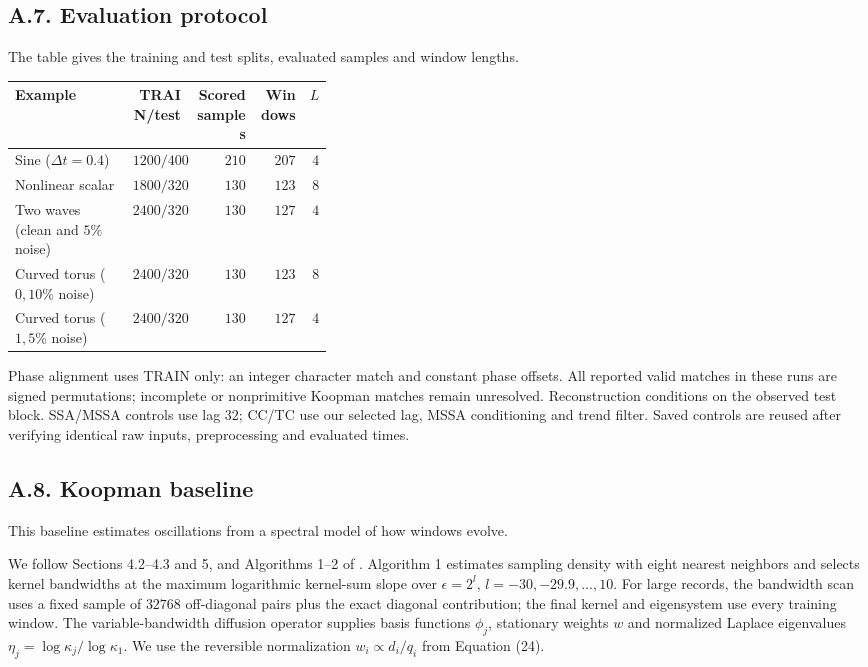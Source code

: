 \documentclass[11pt,a4paper]{article}
\begin{document}
\subsection*{A.7. Evaluation protocol}
\label{app:evaluation}
The table gives the training and test splits, evaluated samples and window lengths.
\begin{center}
\begin{tabular}{@{}p{0.37\linewidth}rrrr@{}}
\toprule
Example & TRAIN/test & Scored samples & Windows & $L$\\
\midrule
Sine ($\Delta t=0.4$) & $1200/400$ & $210$ & $207$ & $4$\\
Nonlinear scalar & $1800/320$ & $130$ & $123$ & $8$\\
Two waves (clean and $5\%$ noise) & $2400/320$ & $130$ & $127$ & $4$\\
Curved torus ($0,10\%$ noise) & $2400/320$ & $130$ & $123$ & $8$\\
Curved torus ($1,5\%$ noise) & $2400/320$ & $130$ & $127$ & $4$\\
\bottomrule
\end{tabular}
\end{center}
Phase alignment uses TRAIN only: an integer character match and constant
phase offsets. All reported valid matches in these runs are signed
permutations; incomplete or nonprimitive Koopman matches remain unresolved.
Reconstruction conditions on the observed test block.
SSA/MSSA controls use lag $32$; CC/TC use our selected lag, MSSA
conditioning and trend filter. Saved controls are reused after verifying
identical raw inputs, preprocessing and evaluated times.

\subsection*{A.8. Koopman baseline}
\label{app:koopman}
This baseline estimates oscillations from a spectral model of how windows evolve.

We follow Sections 4.2--4.3 and 5, and Algorithms 1--2 of
\citet{Giannakis2019}. Algorithm 1 estimates sampling density with eight
nearest neighbors and selects kernel bandwidths at the maximum logarithmic
kernel-sum slope over $\epsilon=2^l$, $l=-30,-29.9,\ldots,10$.
For large records, the bandwidth scan uses a fixed sample of $32768$
off-diagonal pairs plus the exact diagonal contribution; the final kernel
and eigensystem use every training window. The variable-bandwidth diffusion
operator supplies basis functions $\phi_j$, stationary weights $w$ and
normalized Laplace eigenvalues $\eta_j=\log\kappa_j/\log\kappa_1$.
We use the reversible normalization $w_i\propto d_i/q_i$ from Equation (24).
\end{document}
